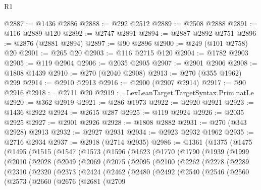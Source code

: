 \begin{lexlean}{R1}
\begin{coremodule}
@2887 := @1436 @2886
@2888 := @292 @2512
@2889 := @2508 @2888
@2891 := @116 @2889 @120
@2892 := @2747 @2891
@2894 := @2887 @2892 @2751
@2896 := @2876 (@2881 @2894)
@2897 := @90 @2896
@2900 := @249 (@101 @2758) @20
@2901 := @265 @20
@2903 := @116 @2715 @120
@2904 := @1782 @2903
@2905 := @119 @2904
@2906 := @2035 @2905
@2907 := @2901 @2906
@2908 := @1808 @1439
@2910 := @270 (@2040 @2908)
@2913 := @270 (@355 @1962) @299
@2914 := @2910 @2913
@2916 := @2900 (@2907 @2914)
@2917 := @90 @2916
@2918 := @2711 @20
@2919 := LexLeanTarget.TargetSyntax.Prim.natLe
@2920 := @362 @2919
@2921 := @286 @1973
@2922 := @2920 @2921
@2923 := @1436 @2922
@2924 := @2615 @287
@2925 := @119 @2924
@2926 := @2035 @2925
@2927 := @2901 @2926
@2928 := @1808 @2882
@2931 := @270 (@343 @2928) @2913
@2932 := @2927 @2931
@2934 := @2923 @2932 @1962
@2935 := @2716 @2934
@2937 := @2918 (@2714 @2935)
@2986 := @1361
    (@1375
      (@1475
        (@1495
          (@1515
            (@1547
              (@1573
                (@1596
                  (@1623
                    (@1770
                      (@1790
                        (@1939
                          (@1999
                            (@2010
                              (@2028
                                (@2049
                                  (@2069
                                    (@2075
                                      (@2095
                                        (@2100
                                          (@2262
                                            (@2278
                                              (@2289
                                                (@2310
                                                  (@2320
                                                    (@2373
                                                      (@2424
                                                        (@2462
                                                          (@2480
                                                            (@2492
                                                              (@2540
                                                                (@2546
                                                                  (@2560
                                                                    (@2573
                                                                      (@2660
                                                                        (@2676
                                                                          (@2681
                                                                            (@2709

\end{coremodule}
\end{lexlean}

